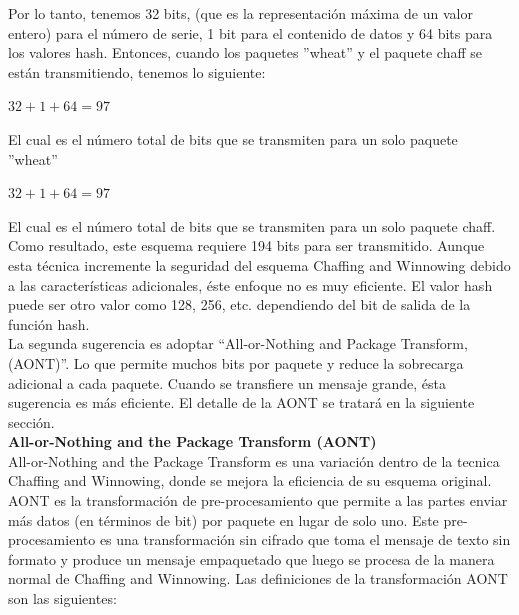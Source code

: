 \documentclass[12pt, a4paper, titlepage]{article}
\begin{document}
        Por lo tanto, tenemos 32 bits, (que es la representación máxima de un valor entero) para el número de serie, 1 bit para el contenido de datos y 64 bits para los valores hash. Entonces, cuando los paquetes ''wheat'' y el paquete chaff se están transmitiendo, tenemos lo siguiente:
        \begin{center}
        $32 + 1 + 64 = 97$
        \end{center}
        El cual es el número total de bits que se transmiten para un solo paquete ''wheat''
        \begin{center}
        $32 + 1 + 64 = 97$  
        \end{center}
        El cual es el número total de bits que se transmiten para un solo paquete chaff. Como resultado, este esquema requiere 194 bits para ser transmitido. Aunque esta técnica incremente la seguridad del esquema Chaffing and Winnowing debido a las características adicionales, éste enfoque no es muy eficiente. El valor hash puede ser otro valor como 128, 256, etc. dependiendo del bit de salida de la función hash.\\
        
        La segunda sugerencia es adoptar “All-or-Nothing and Package Transform, (AONT)”.
        Lo que permite muchos bits por paquete y reduce la sobrecarga adicional a cada paquete. 
        Cuando se transfiere un mensaje grande, ésta sugerencia es más eficiente. El detalle de la AONT se tratará en la siguiente sección.\\
        
        \textbf{All-or-Nothing and the Package Transform (AONT)}\\
        
        All-or-Nothing and the Package Transform es una variación dentro de la tecnica Chaffing and Winnowing, donde se mejora la eficiencia de su esquema original. AONT es la transformación de pre-procesamiento que permite a las partes enviar más datos (en términos de bit) por paquete en lugar de solo uno. Este pre-procesamiento es una transformación sin cifrado que toma el mensaje de texto sin formato y produce un mensaje empaquetado que luego se procesa de la manera normal de Chaffing and Winnowing. Las definiciones de la transformación AONT son las siguientes:
        
\end{document}
